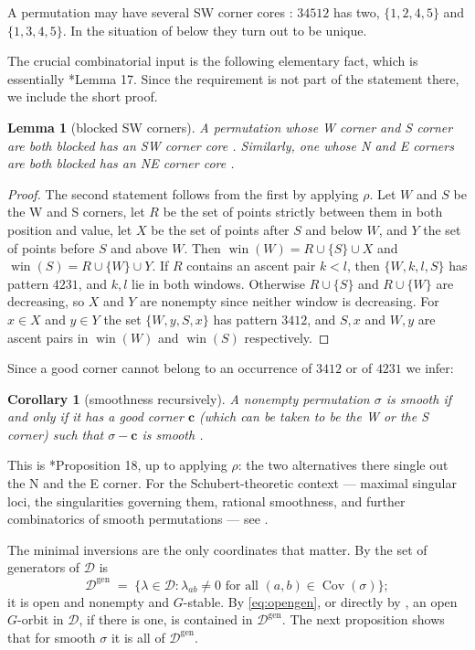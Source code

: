 \documentclass[12pt]{article}
\def\xspace{ }%
\newtheorem{lemma}[lemma]{Lemma}
\newtheorem{corollary}[corollary]{Corollary}
\theoremstyle{definition}
\newcommand{\smth}{smooth\xspace}
\newcommand{\smthness}{smoothness\xspace}
\newcommand{\good}{good\xspace}
\newcommand{\bmdl}{\mathcal{D}}   %
\newcommand{\gen}{\mathrm{gen}}         %
\newcommand{\wo}{w_0}                 %
\newcommand{\rc}{\rho}                %
\newcommand{\win}{\operatorname{win}}     %
\newcommand{\Cov}{\operatorname{Cov}}  %
\newcommand{\Wcr}{W\xspace}    %
\newcommand{\Ncr}{N\xspace}    %
\newcommand{\Scr}{S\xspace}    %
\newcommand{\Ecr}{E\xspace}    %
\newcommand{\SWcr}{SW\xspace}  %
\newcommand{\NEcr}{NE\xspace}  %
\newcommand{\core}{corner core\xspace}
\newcommand{\cores}{corner cores\xspace}
\newcommand{\crn}{\mathbf{c}}              %
\begin{document}
A permutation may have several \SWcr \cores: $34512$ has two, $\{1,2,4,5\}$ and
$\{1,3,4,5\}$. In the situation of  below
they turn out to be unique.

The crucial combinatorial input is the following elementary fact, which is essentially \cite{MR2450335}*{Lemma 17}.
Since the requirement  is not part of the statement there, we include the short proof.
\begin{lemma}[blocked \SWcr corners]\label{lem:swcore}
A permutation whose \Wcr corner and \Scr corner are both blocked has
an \SWcr \core. Similarly, one whose \Ncr and \Ecr corners are both blocked has an \NEcr \core.
\end{lemma}

\begin{proof}
The second statement follows from the first by applying $\rc$.
Let $W$ and $S$ be the \Wcr and \Scr corners, let $R$ be the set of points strictly between them in both position and value,
let $X$ be the set of points after $S$ and below $W$, and $Y$ the set of points before $S$ and above $W$.
Then $\win(W) = R \cup \{S\} \cup X$ and $\win(S) = R \cup \{W\} \cup Y$.
If $R$ contains an ascent pair $k < l$, then $\{W,k,l,S\}$ has pattern $4231$, and $k,l$ lie in both windows.
Otherwise $R \cup \{S\}$ and $R \cup \{W\}$ are decreasing, so $X$ and $Y$ are nonempty since neither window is decreasing.
For $x \in X$ and $y \in Y$ the set $\{W,y,S,x\}$ has pattern $3412$, and $S,x$ and $W,y$ are ascent pairs in $\win(W)$ and $\win(S)$ respectively.
\end{proof}

Since a \good corner cannot belong to an occurrence of $3412$ or of $4231$ we infer:
\begin{corollary}[\smthness recursively]\label{prop:smoothrec}
A nonempty permutation $\sigma$ is \smth if and only if it has a
\good corner $\crn$ (which can be taken to be the \Wcr or the \Scr corner) such that $\sigma - \crn$ is \smth.
\end{corollary}
This is \cite{MR2450335}*{Proposition 18}, up to applying $\rc$: the two alternatives
there single out the \Ncr and the \Ecr corner.
For the Schubert-theoretic context --- maximal singular loci, the singularities
governing them, rational smoothness, and further combinatorics of \smth
permutations --- see \cites{MR1990570,MR2422304,MR1278700,MR4290619}.

The minimal inversions are the only coordinates that matter.
By  the set of generators of $\bmdl$ is
\begin{equation}\label{eq:Dcirc}
   \bmdl^{\gen} \;=\; \{\lambda \in \bmdl :
      \lambda_{ab} \ne 0 \text{ for all } (a,b) \in \Cov(\sigma)\} ;
\end{equation}
it is open and nonempty and $G$-stable.
By \eqref{eq:opengen}, or directly by , an open $G$-orbit in
$\bmdl$, if there is one, is contained in $\bmdl^{\gen}$. The next proposition
shows that for \smth $\sigma$ it is all of $\bmdl^{\gen}$.
\end{document}
